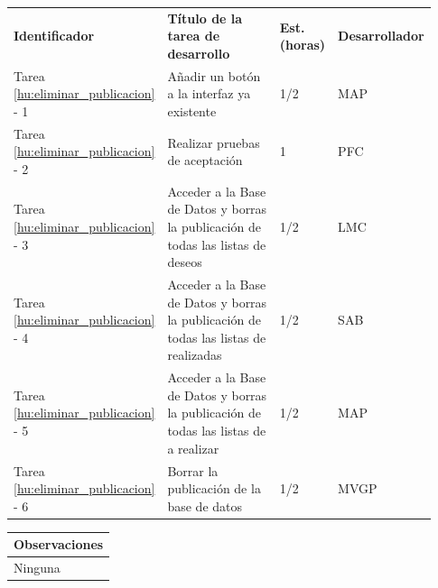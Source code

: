 \documentclass[11pt]{article}
\begin{document}
\begin{longtable}{p{0.18\linewidth}|p{0.48\linewidth}|p{0.1\linewidth}|p{0.17\linewidth}}
  \toprule
  \textbf{Identificador} & \textbf{Título de la tarea de desarrollo} & \textbf{Est. (horas)} & \textbf{Desarrollador} \\
  Tarea \ref{hu:eliminar_publicacion} - 1 & Añadir un botón a la interfaz ya existente & 1/2 & MAP\\
  Tarea \ref{hu:eliminar_publicacion} - 2 & Realizar pruebas de aceptación& 1 & PFC \\
    Tarea \ref{hu:eliminar_publicacion} - 3 & Acceder a la Base de Datos y borras la publicación de todas las listas de deseos & 1/2 & LMC\\
    
    Tarea \ref{hu:eliminar_publicacion} - 4 & Acceder a la Base de Datos y borras la publicación de todas las listas de realizadas & 1/2 & SAB\\
    
  Tarea \ref{hu:eliminar_publicacion} - 5 & Acceder a la Base de Datos y borras la publicación de todas las listas de a realizar & 1/2 & MAP\\
  
  Tarea \ref{hu:eliminar_publicacion} - 6 & Borrar la publicación de la base de datos & 1/2 &  MVGP\\
  \bottomrule
\end{longtable}
\vspace{-0.8cm}
\begin{longtable}{p{1.028\linewidth}}
  \textbf{Observaciones}\\
  \midrule
  Ninguna\\
  \bottomrule
\end{longtable}
\end{document}
